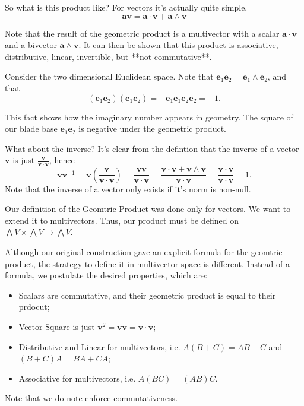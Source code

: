 So what is this product like? For vectors it's actually quite simple,
\begin{displaymath}    
    \mathbf a  \mathbf v = \mathbf a \cdot \mathbf v + \mathbf a \wedge \mathbf v
\end{displaymath}

Note that the result of the geometric product is a multivector with a scalar $\mathbf a \cdot \mathbf v$
and a bivector $\mathbf a \wedge \mathbf v$.
It can then be shown that this product is associative, distributive, linear, invertible, but  **not commutative**.

Consider the two dimensional Euclidean space. Note that $\mathbf e_1 \mathbf e_2 = \mathbf e_1 \wedge \mathbf e_2$,
and that
\begin{displaymath}
(\mathbf e_1 \mathbf e_2) (\mathbf e_1 \mathbf e_2) =
- \mathbf e_1 \mathbf e_1 \mathbf e_2 \mathbf e_2 = - 1.
\end{displaymath}

This fact shows how the imaginary number appears in geometry. The square of our blade base $\mathbf e_1 \mathbf e_2$
is negative under the geometric product.

What about the inverse? It's clear from the defintion that the inverse of a vector $\mathbf v$
is just $\frac{\mathbf v}{\mathbf v \cdot \mathbf v}$, hence
\begin{displaymath}
    \mathbf v \mathbf v^{-1} = \mathbf v \left(\frac{\mathbf v}{\mathbf v \cdot \mathbf v}\right) = 
    \frac{\mathbf v \mathbf v}{\mathbf v \cdot \mathbf v} =
    \frac{\mathbf v \cdot \mathbf v + \mathbf v \wedge \mathbf v}{\mathbf v \cdot \mathbf v} = 
    \frac{\mathbf v \cdot \mathbf v}{\mathbf v \cdot \mathbf v} =  1.
\end{displaymath}
Note that the inverse of a vector only exists if it's norm is non-null.

Our definition of the Geomtric Product was done only for vectors. We want to extend
it to multivectors. Thus, our product must be defined on
$\bigwedge V \times \bigwedge V \to \bigwedge V$.

Although our original construction gave an explicit formula for the geomtric product, the strategy
to define it in multivector space is different. Instead of a formula, we postulate the desired properties, which are:
\begin{itemize}
    \item Scalars are commutative, and their geometric product is equal to their prdocut;
    \item Vector Square is just $\mathbf v^2 = \mathbf v \mathbf v = \mathbf v \cdot \mathbf v$;
    \item Distributive and Linear for multivectors, i.e. $A(B + C) = AB + C$ and $(B+C)A = BA + CA$;
    \item Associative for multivectors, i.e. $A(BC) = (AB)C$.
\end{itemize}
Note that we do note enforce commutativeness.

